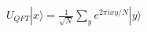 \documentclass[preview]{standalone}
\begin{document}
\begin{align*}
U_{QFT} |x\rangle = \frac{1}{\sqrt{N}} \sum_{y}e^{2πixy/N} |y\rangle
\end{align*}
\end{document}
